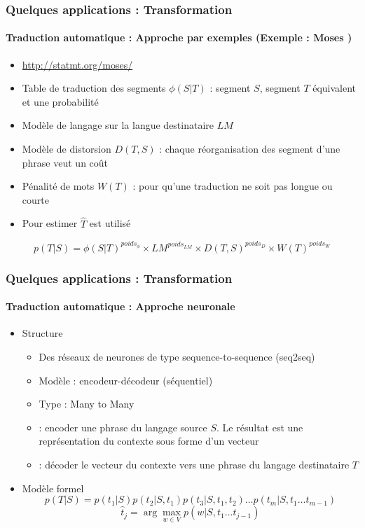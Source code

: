 \documentclass[xcolor=table]{beamer}
\begin{document}
\begin{frame}
	\frametitle{Quelques applications : Transformation}
	\framesubtitle{Traduction automatique : Approche par exemples (Exemple : Moses \cite{07-koehn-al})}
	\begin{itemize}
		\item \url{http://statmt.org/moses/}
		\item Table de traduction des segments $\phi(S|T)$ : segment $S$, segment $T$ équivalent et une probabilité
		\item Modèle de langage sur la langue destinataire $LM$
		\item Modèle de distorsion $ D(T, S) $ : chaque réorganisation des segment d'une phrase veut un coût 
		\item Pénalité de mots $W(T)$ : pour qu'une traduction ne soit pas longue ou courte
		\item Pour estimer $\hat{T}$  est utilisé
	\end{itemize}

	\[p(T|S) = \phi(S|T)^{poids_{\phi}} \times LM^{poids_{LM}} \times D(T, S)^{poids_{D}} \times W(T)^{poids_{W}}\]
\end{frame}

\begin{frame}
	\frametitle{Quelques applications : Transformation}
	\framesubtitle{Traduction automatique : Approche neuronale}
	\begin{itemize}
		\item Structure
		\begin{itemize}
			\item Des réseaux de neurones de type sequence-to-sequence (seq2seq)
			\item Modèle : encodeur-décodeur (séquentiel)
			\item Type : Many to Many 
			\item {} : encoder une phrase du langage source $S$. Le résultat est une représentation du contexte sous forme d'un vecteur
			\item {} : décoder le vecteur du contexte vers une phrase du langage destinataire $T$
		\end{itemize}
	
		\item Modèle formel 
		\[ p(T|S) = p(t_1|S) p(t_2|S, t_1) p(t_3|S, t_1, t_2)\ldots p(t_m|S, t_1\ldots t_{m-1}) \]
		\[\hat{t}_j = \arg\max_{w \in V} p(w | S, t_1\ldots t_{j-1})\]
	\end{itemize}
\end{frame}
\end{document}

